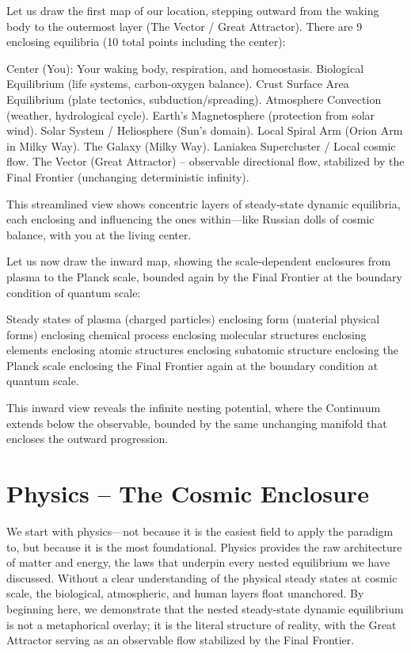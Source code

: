 Let us draw the first map of our location, stepping outward from the waking body to the outermost layer (The Vector / Great Attractor). There are 9 enclosing equilibria (10 total points including the center):

Center (You): Your waking body, respiration, and homeostasis.  
Biological Equilibrium (life systems, carbon-oxygen balance).  
Crust Surface Area Equilibrium (plate tectonics, subduction/spreading).  
Atmosphere Convection (weather, hydrological cycle).  
Earth’s Magnetosphere (protection from solar wind).  
Solar System / Heliosphere (Sun’s domain).  
Local Spiral Arm (Orion Arm in Milky Way).  
The Galaxy (Milky Way).  
Laniakea Supercluster / Local cosmic flow.  
The Vector (Great Attractor) – observable directional flow, stabilized by the Final Frontier (unchanging deterministic infinity).

This streamlined view shows concentric layers of steady-state dynamic equilibria, each enclosing and influencing the ones within—like Russian dolls of cosmic balance, with you at the living center.

Let us now draw the inward map, showing the scale-dependent enclosures from plasma to the Planck scale, bounded again by the Final Frontier at the boundary condition of quantum scale:

Steady states of plasma (charged particles) enclosing form (material physical forms) enclosing chemical process enclosing molecular structures enclosing elements enclosing atomic structures enclosing subatomic structure enclosing the Planck scale enclosing the Final Frontier again at the boundary condition at quantum scale.

This inward view reveals the infinite nesting potential, where the Continuum extends below the observable, bounded by the same unchanging manifold that encloses the outward progression.

\appendix

\chapter{Physics – The Cosmic Enclosure}

We start with physics—not because it is the easiest field to apply the paradigm to, but because it is the most foundational. Physics provides the raw architecture of matter and energy, the laws that underpin every nested equilibrium we have discussed. Without a clear understanding of the physical steady states at cosmic scale, the biological, atmospheric, and human layers float unanchored. By beginning here, we demonstrate that the nested steady-state dynamic equilibrium is not a metaphorical overlay; it is the literal structure of reality, with the Great Attractor serving as an observable flow stabilized by the Final Frontier.

